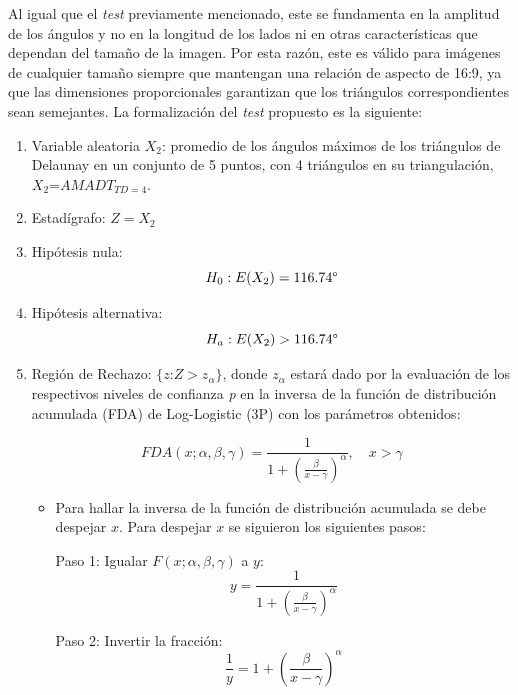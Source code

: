 \documentclass[12pt]{report}
\begin{document}
Al igual que el \textit{test} previamente mencionado, este se fundamenta en la amplitud de los ángulos y no en la longitud de los lados ni en otras características que dependan del tamaño de la imagen. Por esta razón, este es válido para imágenes de cualquier tamaño siempre que mantengan una relación de aspecto de 16:9, ya que las dimensiones proporcionales garantizan que los triángulos correspondientes sean semejantes. La formalización del \textit{test} propuesto es la siguiente:
\begin{enumerate}
	\item Variable aleatoria $X_2$: promedio de los ángulos máximos de los triángulos de Delaunay en un conjunto de 5 puntos, con 4 triángulos en su triangulación, $X_2$=$AMADT_{TD=4}$.
	\item Estadígrafo: $Z=X_2$
	
	\item Hipótesis nula: \[H_0:E(X_2)=116.74\degree\]
	
	
	\item Hipótesis alternativa: \[H_a:E(X_2)>116.74\degree\]
	
	\item  Región de Rechazo: $\{z$:$Z>z_\alpha\}$, donde  $z_\alpha$ estará dado por la evaluación de los respectivos niveles de confianza \textit{p} en la  inversa de la función de distribución acumulada (FDA) de Log-Logistic (3P) con los parámetros obtenidos: 
	
	\[
	FDA(x; \alpha, \beta, \gamma) = \frac{1}{1 + \left( \frac{\beta}{x - \gamma} \right)^\alpha}, \quad x > \gamma
	\]
	\begin{itemize}
		\item  Para hallar la inversa de la función de distribución acumulada se debe despejar $x$. Para despejar \( x \)  se siguieron los siguientes pasos:
		
		Paso 1: Igualar \( F(x; \alpha, \beta, \gamma) \) a \( y \):
		\[
		y = \frac{1}{1 + \left( \frac{\beta}{x - \gamma} \right)^\alpha}
		\]
		
		Paso 2: Invertir la fracción:
		\[
		\frac{1}{y} = 1 + \left( \frac{\beta}{x - \gamma} \right)^\alpha
		\]
		

\end{itemize}
\end{enumerate}
\end{document}
